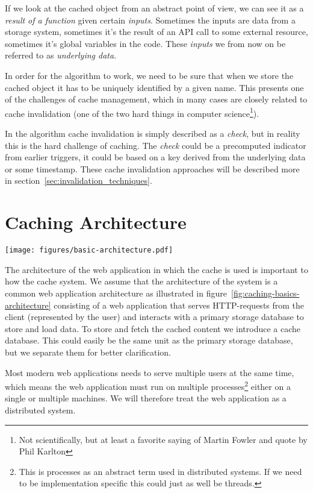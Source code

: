 If we look at the cached object from an abstract point of view, we can see it as a \emph{result of a function} given certain \emph{inputs}. Sometimes the inputs are data from a storage system, sometimes it's the result of an API call to some external resource, sometimes it's global variables in the code. These \emph{inputs} we from now on be referred to as \emph{underlying data}.

In order for the algorithm to work, we need to be sure that when we store the cached object it has to be uniquely identified by a given name. This presents one of the challenges of cache management, which in many cases are closely related to cache invalidation (one of the two hard things in computer science\footnote{Not scientifically, but at least a favorite saying of Martin Fowler and quote by Phil Karlton}).

In the algorithm cache invalidation is simply described as a \emph{check}, but in reality this is the hard challenge of caching. The \emph{check} could be a precomputed indicator from earlier triggers, it could be based on a key derived from the underlying data or some timestamp. These cache invalidation approaches will be described more in section~\ref{sec:invalidation_techniques}.

\section{Caching Architecture}
\label{subsec:architecture}

\begin{figure*}[ht!]
  \centering
  \texttt{[image: figures/basic-architecture.pdf]}
  \caption{The assumed architecture of the system}
  \label{fig:caching-basics-architecture}
\end{figure*}

The architecture of the web application in which the cache is used is important to how the cache system. We assume that the architecture of the system is a common web application architecture as illustrated in figure~\ref{fig:caching-basics-architecture} consisting of a web application that serves HTTP-requests from the client (represented by the user) and interacts with a primary storage database to store and load data. To store and fetch the cached content we introduce a cache database. This could easily be the same unit as the primary storage database, but we separate them for better clarification.

Most modern web applications needs to serve multiple users at the same time, which means the web application must run on multiple processes\footnote{This is processes as an abstract term used in distributed systems. If we need to be implementation specific this could just as well be threads.} either on a single or multiple machines. We will therefore treat the web application as a distributed system.

